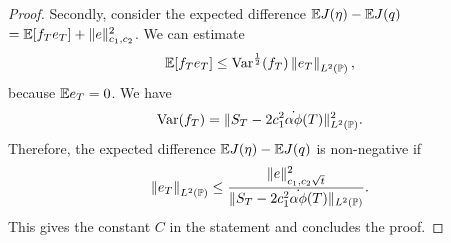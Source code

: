 \documentclass[10pt,a4paper]{article}
\begin{document}
\begin{proof}
		Secondly, consider the   expected difference $\Expectation \costFunctional (\eta) - \Expectation \costFunctional (\inventory)$ $=\Expectation[f_\timeHorizon e_\timeHorizon] + \normInventoryTrjectories{e}\squared$. We can estimate
		\begin{equation*}
		\Expectation[f_\timeHorizon e_\timeHorizon] \leq \Variance^{\half}(f_\timeHorizon)\norm[e_\timeHorizon]_{\Ltwo(\Prob)},
		\end{equation*}
		because $\Expectation e_\timeHorizon = 0$. We have  
		\begin{equation*}
		\Variance(f_\timeHorizon)
		= \lVert \fundamentalPrice_\timeHorizon - 2\coeffMarketImpact\squared \dot{\alpha\phi} (\timeHorizon) \rVert_{\Ltwo(\Prob)}^{2}. 
		\end{equation*} 
		Therefore, the   expected difference $\Expectation \costFunctional (\eta) - \Expectation \costFunctional (\inventory)$ is non-negative if 
		\begin{equation*}
		\norm[e_\timeHorizon]_{\Ltwo(\Prob)} \leq 
		\frac{ \lVert e \rVert_{\coeffMarketImpact, \coeffRiskAversion\sqrt{t}} \squared }{\lVert \fundamentalPrice_\timeHorizon - 2\coeffMarketImpact\squared \dot{\alpha\phi} (\timeHorizon) \rVert_{\Ltwo(\Prob)}}.
		\end{equation*}
		This gives the constant $C$ in the statement and concludes the proof.
%		
%		
%		
%		

\end{proof}
\end{document}
